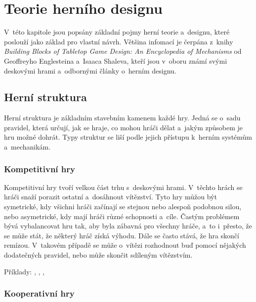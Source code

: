 \chapter{Teorie herního designu}
\label{chap:game_design}

V~této kapitole jsou popsány základní pojmy herní teorie a~designu, které poslouží jako základ pro vlastní návrh. Většina infomací je čerpána z~knihy \textit{Building Blocks of Tabletop Game Design: An Encyclopedia of Mechanisms} od Geoffreyho Englesteina a~Isaaca Shaleva, kteří jsou v~oboru známí svými deskovými hrami a~odbornými články o~herním designu. 
\cite{building_blocks_of_tabletop_design_2022}



\section{Herní struktura}
\label{sec:structure}

Herní struktura je základním stavebním kamenem každé hry. Jedná se o~sadu pravidel, která určují, jak se hraje, co mohou hráči dělat a~jakým způsobem je hru možné dohrát. Typy struktur se liší podle jejich přístupu k~herním systémům a~mechanikám. 

\subsection{Kompetitivní hry}
\label{subsec:structure_competitive}

Kompetitivní hry tvoří velkou část trhu s~deskovými hrami. V~těchto hrách se hráči snaží porazit ostatní a~dosáhnout vítězství. Tyto hry můžou být symetrické, kdy všichni hráči začínají se stejnou nebo alespoň podobnou silou, nebo asymetrické, kdy mají hráči různé schopnosti a~cíle. Častým problémem bývá vybalancovat hru tak, aby byla zábavná pro všechny hráče, a~to i~přesto, že se může stát, že některý hráč získá výhodu. Dále se často stává, že hra skončí remízou. V~takovém případě se může o~vítězi rozhodnout buď pomocí nějakých dodatečných pravidel, nebo může skončit sdíleným vítězstvím.

Příklady: , , , 

\subsection{Kooperativní hry}
\label{subsec:structure_cooperative}

